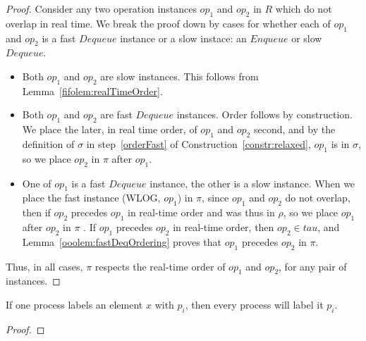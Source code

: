 \documentclass[a4paper,anonymous,USenglish]{lipics-v2021} %
\theoremstyle{definition}
\begin{document}
\begin{proof}
  Consider any two operation instances $op_1$ and $op_2$ in $R$ which do not overlap in real time.  We break the proof down by cases for whether each of $op_1$ and $op_2$ is a fast $Dequeue$ instance or a slow instace: an $Enqueue$ or slow $Dequeue$.
  \begin{itemize}
  \item Both $op_1$ and $op_2$ are slow instances.  This follows from Lemma~\ref{fifolem:realTimeOrder}.
  \item Both $op_1$ and $op_2$ are fast $Dequeue$ instances.  Order follows by construction.  We place the later, in real time order, of $op_1$ and $op_2$ second, and by the definition of $\sigma$ in step~\ref{orderFast} of Construction~\ref{constr:relaxed}, $op_1$ is in $\sigma$, so we place $op_2$ in $\pi$ after $op_1$.
  \item One of $op_1$ is a fast $Dequeue$ instance, the other is a slow instance.  When we place the fast instance (WLOG, $op_1$) in $\pi$, since $op_1$ and $op_2$ do not overlap, then if $op_2$ precedes $op_1$ in real-time order and was thus in $\rho$, so we place $op_1$ after $op_2$ in $\pi$ .  If $op_1$ precedes $op_2$ in real-time order, then $op_2 \in tau$, and Lemma~\ref{ooolem:fastDeqOrdering} proves that $op_1$ precedes $op_2$ in $\pi$.
  \end{itemize}

  Thus, in all cases, $\pi$ respects the real-time order of $op_1$ and $op_2$, for any pair of instances.
\end{proof}


\begin{lemma}
  If one process labels an element $x$ with $p_i$, then every process will label it $p_i$.
\end{lemma}

\begin{proof}

\end{proof}
\end{document}
